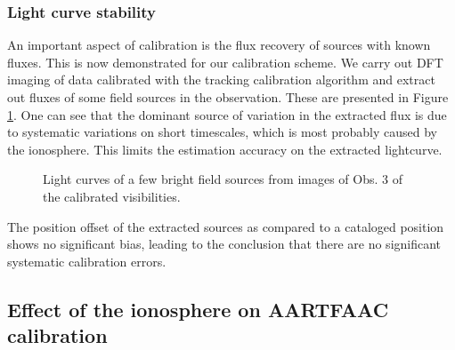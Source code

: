 \documentclass{aa}
\begin{document}
\subsubsection{Light curve stability}

An important  aspect of calibration is  the flux recovery of  sources with known
fluxes. This is  now demonstrated for our calibration scheme.   We carry out DFT
imaging of data  calibrated with the tracking calibration  algorithm and extract
out fluxes  of some field  sources in the  observation.  These are  presented in
Figure  \ref{fig:Light-curves-of}.  One  can  see that  the  dominant source  of
variation  in  the extracted  flux  is due  to  systematic  variations on  short
timescales, which  is most probably caused  by the ionosphere.   This limits the
estimation accuracy on the extracted lightcurve.

\begin{figure}[tbh]

\caption{\label{fig:Light-curves-of}Light curves of a few bright
field sources from images of Obs. 3 of the calibrated visibilities.}
\end{figure}
The position offset  of the extracted sources as  compared to a cataloged position
shows  no  significant  bias,  leading  to  the conclusion  that  there  are  no
significant systematic calibration errors.


\subsection{\label{sub:iono-effect-on-calib}Effect of the ionosphere on AARTFAAC
calibration}
\end{document}
